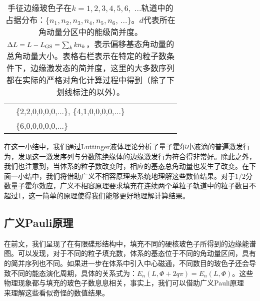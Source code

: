\begin{table}[h]
\begin{tabular}{c|l|l c c c c c}
       & \{2,2,0,0,0,0,...\},   \{4,1,0,0,0,0,...\}                         \\
       & \{6,0,0,0,0,0,...\}                                                 \\
 \hline
 \hline
\end{tabular}
\caption{手征边缘玻色子在$k=1, 2, 3, 4, 5, 6,$ ...轨道中的占据分布：\{$n_1,n_2,n_3,n_4,n_5,n_6$, ...\}。$d$代表所在角动量分区中的能级简并度。$\Delta L = L - L_{\rm GS} = \sum_{k} kn_{k}$，表示偏移基态角动量的总角动量大小。表格右栏表示在特定的粒子数条件下，边缘激发态的简并度，这里的大多数序列都在实际的严格对角化计算过程中得到（除了下划线标注的以外）。}
\label{tab:luttinger}
\end{table}



在这一小结中，我们通过Luttinger液体理论分析了量子霍尔小液滴的普遍激发行为，发现这一激发序列与分数陈绝缘体的边缘激发行为符合得非常好。除此之外，我们也注意到，当体系的粒子数改变时，相应的基态总角动量也发生了改变。在下面一小结中，我们将借助广义不相容原理来系统地理解这些数值结果。对于$1/2$分数量子霍尔效应，广义不相容原理要求填充在连续两个单粒子轨道中的粒子数目不超过1，这一简单的原理使得我们能够更好地理解计算结果。


\subsection{广义Pauli原理}
在前文，我们呈现了在有限碟形结构中，填充不同的硬核玻色子所得到的边缘能谱图。可以发现，对于不同的粒子填充数，体系的基态位于不同的角动量区间，具有的简并序列也不同。如果进一步在体系中引入中心磁通，不同数目的玻色子还会导致不同的能态演化周期，具体的关系式为：$E_n(L,\Phi+2q\pi)=E_n(L,\Phi)$。这些物理现象都与填充的玻色子数息息相关，事实上，我们可以借助广义Pauli原理~\cite{Regnault2011,Bernevig2008,Bergholtz2006,Seidel2006}
来理解这些看似奇怪的数值结果。


